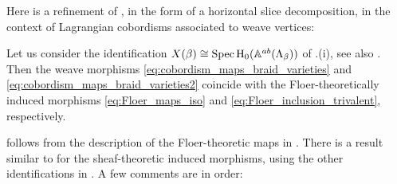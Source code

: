 \noindent  Here is a refinement of , in the form of a horizontal slice decomposition, in the context of Lagrangian cobordisms associated to weave vertices:

\begin{lemma}\label{lem:floer_morphisms_weave_morphisms}
Let us consider the identification $X(\beta)\cong \operatorname{Spec} \mbox{H}_0(\mathbb{A}^{ab}(\Lambda_{\beta}))$ of .(i), see also . Then the weave morphisms \eqref{eq:cobordism_maps_braid_varieties} and \eqref{eq:cobordism_maps_braid_varieties2} coincide with the Floer-theoretically induced morphisms \eqref{eq:Floer_maps_iso} and \eqref{eq:Floer_inclusion_trivalent}, respectively.\sbs
\end{lemma}

\noindent {} follows from the description of the Floer-theoretic maps in \cite[Section 5]{CasalsNg22}. There is a result similar to  for the sheaf-theoretic induced morphisms, using the other identifications in . A few comments are in order:

